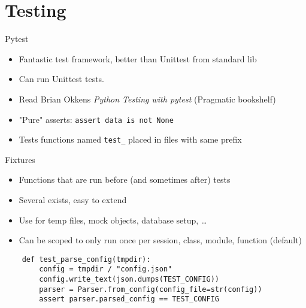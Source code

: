 \section{Testing}

\begin{frame}{Pytest}
  \begin{itemize}
    \item Fantastic test framework, better than Unittest from standard lib
    \item Can run Unittest tests.
    \item Read Brian Okkens \emph{Python Testing with pytest} (Pragmatic bookshelf)
    \item "Pure" asserts: \texttt{assert data is not None}
    \item Tests functions named \texttt{test\_} placed in files with same prefix
  \end{itemize}
\end{frame}



\begin{frame}[fragile]{Fixtures}
  \begin{itemize}
    \item Functions that are run before (and sometimes after) tests
    \item Several exists, easy to extend
    \item Use for temp files, mock objects, database setup, …
    \item Can be scoped to only run once per session, class, module, function (default)
  \end{itemize}

  \begin{verbatim}
    def test_parse_config(tmpdir):
        config = tmpdir / "config.json"
        config.write_text(json.dumps(TEST_CONFIG))
        parser = Parser.from_config(config_file=str(config))
        assert parser.parsed_config == TEST_CONFIG
  \end{verbatim}
\end{frame}


